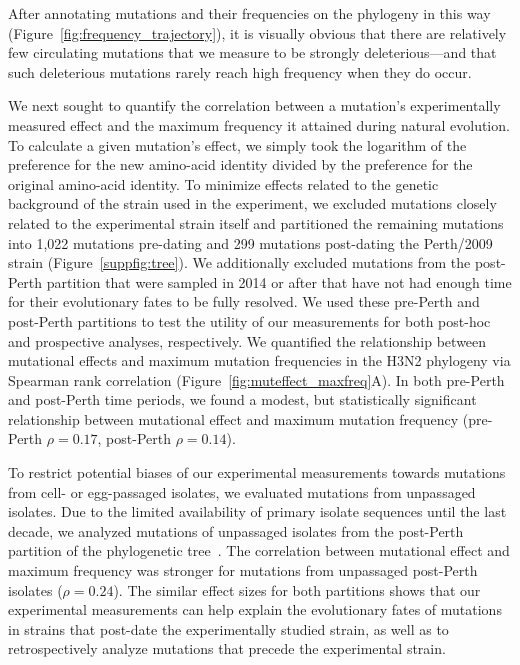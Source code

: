 \documentclass[9pt,twocolumn,twoside]{pnas-new}
\begin{document}
After annotating mutations and their frequencies on the phylogeny in this way (Figure~\ref{fig:frequency_trajectory}), it is visually obvious that there are relatively few circulating mutations that we measure to be strongly deleterious---and that such deleterious mutations rarely reach high frequency when they do occur.

We next sought to quantify the correlation between a mutation's experimentally measured effect and the maximum frequency it attained during natural evolution.
To calculate a given mutation's effect, we simply took the logarithm of the preference for the new amino-acid identity divided by the preference for the original amino-acid identity.
To minimize effects related to the genetic background of the strain used in the experiment, we excluded mutations closely related to the experimental strain itself and partitioned the remaining mutations into 1,022 mutations pre-dating and 299 mutations post-dating the Perth/2009 strain (Figure~\ref{suppfig:tree}).
We additionally excluded mutations from the post-Perth partition that were sampled in 2014 or after that have not had enough time for their evolutionary fates to be fully resolved.
We used these pre-Perth and post-Perth partitions to test the utility of our measurements for both post-hoc and prospective analyses, respectively.
We quantified the relationship between mutational effects and maximum mutation frequencies in the H3N2 phylogeny via Spearman rank correlation (Figure~\ref{fig:muteffect_maxfreq}A).
In both pre-Perth and post-Perth time periods, we found a modest, but statistically significant relationship between mutational effect and maximum mutation frequency (pre-Perth $\rho = 0.17$, post-Perth $\rho = 0.14$). 

To restrict potential biases of our experimental measurements towards mutations from cell- or egg-passaged isolates, we evaluated mutations from unpassaged isolates.
Due to the limited availability of primary isolate sequences until the last decade, we analyzed mutations of unpassaged isolates from the post-Perth partition of the phylogenetic tree~\cite{mcwhite2016sequence}.
The correlation between mutational effect and maximum frequency was stronger for mutations from unpassaged post-Perth isolates ($\rho = 0.24$).
The similar effect sizes for both partitions shows that our experimental measurements can help explain the evolutionary fates of mutations in strains that post-date the experimentally studied strain, as well as to retrospectively analyze mutations that precede the experimental strain. 
\end{document}
